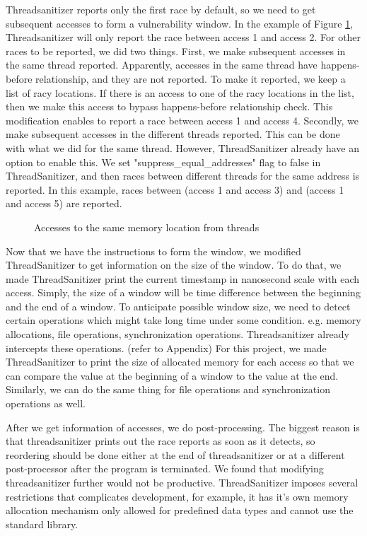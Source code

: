 \documentclass{acm_proc_article-sp}
\begin{document}
Threadsanitizer reports only the first race by default, so we need to get subsequent accesses to form a vulnerability window. In the example of Figure \ref{fig:threadAccesses}, Threadsanitizer will only report the race between access 1 and access 2. For other races to be reported, we did two things. First, we make subsequent accesses in the same thread reported. Apparently, accesses in the same thread have happens-before relationship, and they are not reported. To make it reported, we keep a list of racy locations. If there is an access to one of the racy locations in the list, then we make this access to bypass happens-before relationship check. This modification enables to report a race between access 1 and access 4. Secondly, we make subsequent accesses in the different threads reported. This can be done with what we did for the same thread. However, ThreadSanitizer already have an option to enable this. We set  "suppress\_equal\_addresses" flag to false in ThreadSanitizer, and then races between different threads for the same address is reported. In this example, races between (access 1 and access 3) and (access 1 and access 5) are reported.

\begin{figure}
\centering
{}
\caption{Accesses to the same memory location from threads}
\label{fig:threadAccesses}
\end{figure}


Now that we have the instructions to form the window, we modified ThreadSanitizer to get information on the size of the window. To do that, we made ThreadSanitizer print the current timestamp in nanosecond scale with each access. Simply, the size of a window will be time difference between the beginning and the end of a window. To anticipate possible window size, we need to detect certain operations which might take long time under some condition. e.g. memory allocations, file operations, synchronization operations. Threadsanitizer already intercepts these operations. (refer to Appendix) For this project, we made ThreadSanitizer to print the size of allocated memory for each access so that we can compare the value at the beginning of a window to the value at the end. Similarly, we can do the same thing for file operations and synchronization operations as well.

After we get information of accesses, we do post-processing. The biggest reason is that threadsanitizer prints out the race reports as soon as it detects, so reordering should be done either at the end of threadsanitizer or at a different post-processor after the program is terminated. We found that modifying threadsanitizer further would not be productive. ThreadSanitizer imposes several restrictions that complicates development, for example, it has it's own memory allocation mechanism only allowed for predefined data types and cannot use the standard library. 
\end{document}
